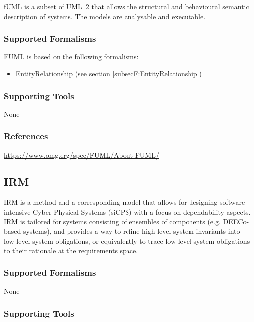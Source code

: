 fUML is a subset of UML~2 that allows the structural and behavioural semantic description of systems.
The models are analysable and executable.

\subsubsection{Supported Formalisms}

FUML is based on the following formalisms:
\begin{itemize}
	\item EntityRelationship (see section \ref{subsecF:EntityRelationship})
\end{itemize}


\subsubsection{Supporting Tools}

None


\subsubsection{References}
\url{https://www.omg.org/spec/FUML/About-FUML/}




\subsection{IRM}
\label{subsecL:IRM}


IRM is a method and a corresponding model that allows for designing software-intensive Cyber-Physical Systems (siCPS) with a focus on dependability aspects. IRM is tailored for systems consisting of ensembles of components (e.g. DEECo-based systems), and provides a way to refine high-level system invariants into low-level system obligations, or equivalently to trace low-level system obligations to their rationale at the requirements space.

\subsubsection{Supported Formalisms}

None


\subsubsection{Supporting Tools}


